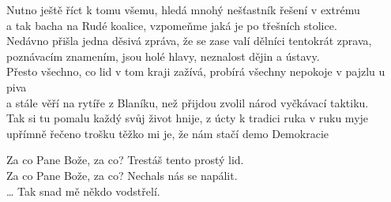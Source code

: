 \begin{small}
\ve{}
Nutno ještě říct k tomu všemu, hledá mnohý nešťastník řešení v extrému\\
a tak bacha na Rudé koalice, vzpomeňme jaká je po třešních stolice.\\
Nedávno přišla jedna děsivá zpráva, že se zase valí dělníci tentokrát zprava,\\
poznávacím znamením, jsou holé hlavy, neznalost dějin a ústavy.\\
Přesto všechno, co lid v tom kraji zažívá, probírá všechny nepokoje v pajzlu u piva\\
a stále věří na rytíře z Blaníku, než přijdou zvolil národ vyčkávací taktiku.\\
Tak si tu pomalu každý svůj život hnije, z úcty k tradici ruka v ruku myje\\
upřímně řečeno trošku těžko mi je, že nám stačí demo Demokracie 
\vspace*{-3pt}

\cho{}
Za co Pane Bože, za co? Trestáš tento prostý lid.\\
Za co Pane Bože, za co? Nechals nás se napálit.\\
\ldots{} Tak snad mě někdo vodstřelí. 
\vspace*{-20pt}
\end{small}

\esong